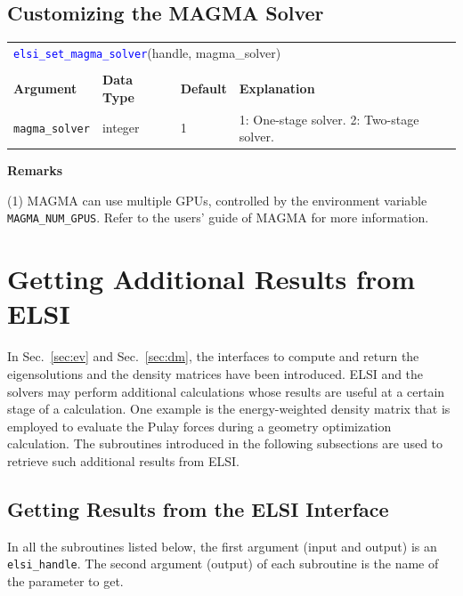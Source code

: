 \documentclass{report}
\newcommand{\api}[1]{\textcolor{blue}{\texttt{#1}}}
\begin{document}
\subsection{Customizing the MAGMA Solver}
\label{subsec:setter_magma}
\begin{tabular}[]{|p{30mm}|p{20mm}|p{15mm}|p{97mm}|}
\multicolumn{4}{l}{\api{elsi\_set\_magma\_solver}(handle, magma\_solver)}\\
\multicolumn{4}{l}{}\\
\hline
\multicolumn{1}{|l|}{\textbf{Argument}} & \multicolumn{1}{l|}{\textbf{Data Type}} & \multicolumn{1}{l|}{\textbf{Default}} & \multicolumn{1}{l|}{\textbf{Explanation}}\\
\hline
\texttt{magma\_solver} & integer & 1 & 1: One-stage solver. 2: Two-stage solver.\\
\hline
\end{tabular}

\textbf{Remarks}

(1) MAGMA can use multiple GPUs, controlled by the environment variable \texttt{MAGMA\_NUM\_GPUS}. Refer to the users' guide of MAGMA for more information.

\section{Getting Additional Results from ELSI}
\label{sec:getter}
In Sec.~\ref{sec:ev} and Sec.~\ref{sec:dm}, the interfaces to compute and return the eigensolutions and the density matrices have been introduced. ELSI and the solvers may perform additional calculations whose results are useful at a certain stage of a calculation. One example is the energy-weighted density matrix that is employed to evaluate the Pulay forces during a geometry optimization calculation. The subroutines introduced in the following subsections are used to retrieve such additional results from ELSI.

\subsection{Getting Results from the ELSI Interface}
\label{subsec:getter_elsi}
In all the subroutines listed below, the first argument (input and output) is an \texttt{elsi\_handle}. The second argument (output) of each subroutine is the name of the parameter to get.
\end{document}
